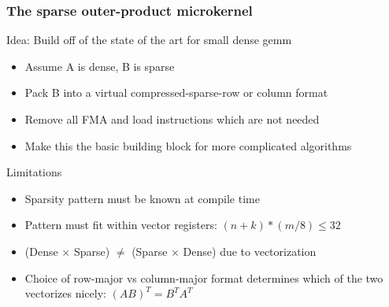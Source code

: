 \documentclass[9pt]{beamer}
\begin{document}
\begin{frame}
  \frametitle{The sparse outer-product microkernel}

  \begin{block}{Idea: Build off of the state of the art for small dense gemm}
    \begin{itemize}
    \item Assume A is dense, B is sparse
    \item Pack B into a virtual compressed-sparse-row or column format
    \item Remove all FMA and load instructions which are not needed
    \item Make this the basic building block for more complicated algorithms 
    \end{itemize}
  \end{block}
  \begin{block}{Limitations}
    \begin{itemize}
    \item Sparsity pattern must be known at compile time
    \item Pattern must fit within vector registers: $(n + k) * (m/8) \leq 32$
    \item (Dense $\times$ Sparse) $\neq$ (Sparse $\times$ Dense) due to vectorization
    \item Choice of row-major vs column-major format determines which of the two vectorizes nicely: $(AB)^T = B^T A^T$
    \end{itemize}
  \end{block}
\end{frame}
\end{document}
